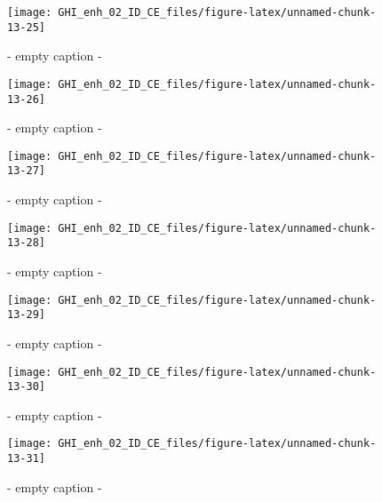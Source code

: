 \documentclass[
  10pt,
  a4paper,oneside]{article}
\begin{document}
\begin{figure}[H]

{\centering \texttt{[image: GHI\_enh\_02\_ID\_CE\_files/figure-latex/unnamed-chunk-13-25]} 

}

\caption{ - empty caption - }\label{fig:unnamed-chunk-13-25}
\end{figure}
\begin{figure}[H]

{\centering \texttt{[image: GHI\_enh\_02\_ID\_CE\_files/figure-latex/unnamed-chunk-13-26]} 

}

\caption{ - empty caption - }\label{fig:unnamed-chunk-13-26}
\end{figure}
\begin{figure}[H]

{\centering \texttt{[image: GHI\_enh\_02\_ID\_CE\_files/figure-latex/unnamed-chunk-13-27]} 

}

\caption{ - empty caption - }\label{fig:unnamed-chunk-13-27}
\end{figure}
\begin{figure}[H]

{\centering \texttt{[image: GHI\_enh\_02\_ID\_CE\_files/figure-latex/unnamed-chunk-13-28]} 

}

\caption{ - empty caption - }\label{fig:unnamed-chunk-13-28}
\end{figure}
\begin{figure}[H]

{\centering \texttt{[image: GHI\_enh\_02\_ID\_CE\_files/figure-latex/unnamed-chunk-13-29]} 

}

\caption{ - empty caption - }\label{fig:unnamed-chunk-13-29}
\end{figure}
\begin{figure}[H]

{\centering \texttt{[image: GHI\_enh\_02\_ID\_CE\_files/figure-latex/unnamed-chunk-13-30]} 

}

\caption{ - empty caption - }\label{fig:unnamed-chunk-13-30}
\end{figure}
\begin{figure}[H]

{\centering \texttt{[image: GHI\_enh\_02\_ID\_CE\_files/figure-latex/unnamed-chunk-13-31]} 

}

\caption{ - empty caption - }\label{fig:unnamed-chunk-13-31}
\end{figure}
\end{document}

